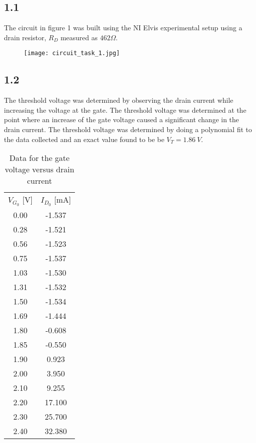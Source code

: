 \subsection*{1.1}
The circuit in figure 1 was built using the NI Elvis experimental setup using a drain resistor, $R_D$ measured as $462 \Omega$.

    \begin{figure}[h!]
        \centering
        \texttt{[image: circuit\_task\_1.jpg]}
    \end{figure}

\subsection*{1.2}
The threshold voltage was determined by observing the drain current while increasing the voltage at the gate. The threshold voltage was determined at the point where an increase of the gate voltage caused a significant change in the drain current. The threshold voltage was determined by doing a polynomial fit to the data collected and an exact value found to be be $V_T = 1.86 \ V$.

   \begin{table}[htbp]
     \centering
     \caption{Data for the gate voltage versus drain current}
       \begin{tabular}{cc}
       $V_{G_0}$ [V]       & $I_{D_0}$ [mA] \\
       0.00         & -1.537 \\
       0.28         & -1.521 \\
       0.56         & -1.523 \\
       0.75         & -1.537 \\
       1.03         & -1.530 \\
       1.31         & -1.532 \\
       1.50         & -1.534 \\
       1.69         & -1.444 \\
       1.80         & -0.608 \\
       1.85         & -0.550 \\
       1.90         & 0.923 \\
       2.00         & 3.950 \\
       2.10         & 9.255 \\
       2.20         & 17.100 \\
       2.30         & 25.700 \\
       2.40         & 32.380 \\
       \end{tabular}%
     \label{tab:addlabel}%
   \end{table}%



